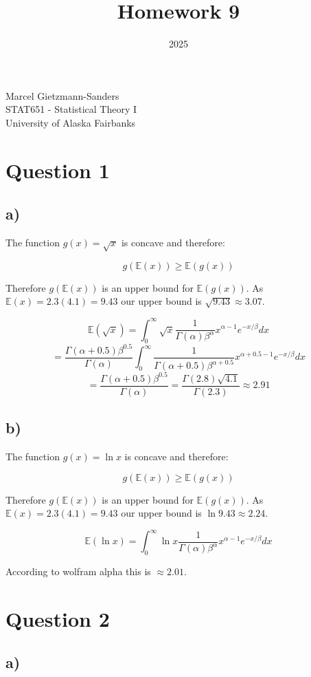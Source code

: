 \documentclass[11pt]{article}
\title{Homework 9}
\date{2025}
\makeatletter
\renewcommand{\maketitle}{
\begin{center}

\pagestyle{empty}

{\Large \bf \@title\par}
\vspace{1cm}

{\LARGE Marcel Gietzmann-Sanders}\\[1cm]

STAT651 - Statistical Theory I \\
University of Alaska Fairbanks


\end{center}
}\makeatother
\makeatother
\begin{document}
\maketitle


\section*{Question 1}

\subsection*{a)}

The function $g(x) = \sqrt{x}$ is concave and therefore:

$$g(\mathbb{E}(x)) \geq \mathbb{E}(g(x))$$

Therefore $g(\mathbb{E}(x))$ is an upper bound for $\mathbb{E}(g(x))$. As $\mathbb{E}(x) = 2.3(4.1) = 9.43$ our upper bound is $\sqrt{9.43} \approx 3.07$. 

$$\mathbb{E}(\sqrt{x}) = \int_0^{\infty} \sqrt{x} \frac{1}{\Gamma(\alpha)\beta^{\alpha}}x^{\alpha - 1}e^{-x/\beta}dx$$
$$=\frac{\Gamma(\alpha+0.5)\beta^{0.5}}{\Gamma(\alpha)}\int_0^{\infty} \frac{1}{\Gamma(\alpha+0.5)\beta^{\alpha + 0.5}}x^{\alpha + 0.5 - 1}e^{-x/\beta}dx$$
$$=\frac{\Gamma(\alpha+0.5)\beta^{0.5}}{\Gamma(\alpha)}=\frac{\Gamma(2.8)\sqrt{4.1}}{\Gamma(2.3)}\approx 2.91$$

\subsection*{b)}

The function $g(x) = \ln{x}$ is concave and therefore:

$$g(\mathbb{E}(x)) \geq \mathbb{E}(g(x))$$

Therefore $g(\mathbb{E}(x))$ is an upper bound for $\mathbb{E}(g(x))$. As $\mathbb{E}(x) = 2.3(4.1) = 9.43$ our upper bound is $\ln{9.43} \approx 2.24$. 

$$\mathbb{E}(\ln{x}) = \int_0^{\infty} \ln{x} \frac{1}{\Gamma(\alpha)\beta^{\alpha}}x^{\alpha - 1}e^{-x/\beta}dx$$

According to wolfram alpha this is $\approx 2.01$.

\section*{Question 2}

\subsection*{a)}
\end{document}
